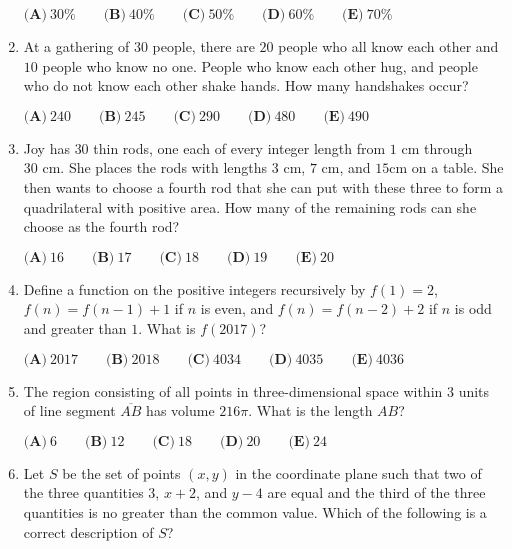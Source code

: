 \documentclass{article}
\begin{document}
\begin{enumerate}[label=\arabic*., itemsep=0.5em]
$\textbf{(A)}\ 30\%\qquad\textbf{(B)}\ 40\%\qquad\textbf{(C)}\ 50\%\qquad\textbf{(D)}\ 60\%\qquad\textbf{(E)}\ 70\%$\par \vspace{0.5em}\item At a gathering of $30$ people, there are $20$ people who all know each other and $10$ people who know no one. People who know each other hug, and people who do not know each other shake hands. How many handshakes occur?

$\textbf{(A)}\ 240\qquad\textbf{(B)}\ 245\qquad\textbf{(C)}\ 290\qquad\textbf{(D)}\ 480\qquad\textbf{(E)}\ 490$\par \vspace{0.5em}\item Joy has $30$ thin rods, one each of every integer length from $1 \text{ cm}$ through $30 \text{ cm}$. She places the rods with lengths $3 \text{ cm}$, $7 \text{ cm}$, and $15 \text{cm}$ on a table. She then wants to choose a fourth rod that she can put with these three to form a quadrilateral with positive area. How many of the remaining rods can she choose as the fourth rod?

$\textbf{(A)}\ 16 \qquad\textbf{(B)}\ 17 \qquad\textbf{(C)}\ 18 \qquad\textbf{(D)}\ 19  \qquad\textbf{(E)}\ 20$\par \vspace{0.5em}\item Define a function on the positive integers recursively by $f(1) = 2$, $f(n) = f(n-1) + 1$ if $n$ is even, and $f(n) = f(n-2) + 2$ if $n$ is odd and greater than $1$. What is $f(2017)$?

$ \textbf{(A)}\ 2017 \qquad\textbf{(B)}\ 2018 \qquad\textbf{(C)}\ 4034 \qquad\textbf{(D)}\ 4035 \qquad\textbf{(E)}\ 4036$\par \vspace{0.5em}\item The region consisting of all points in three-dimensional space within $3$ units of line segment $\overline{AB}$ has volume $216 \pi$. What is the length $AB$?

$ \textbf{(A)}\ 6 \qquad\textbf{(B)}\ 12 \qquad\textbf{(C)}\ 18 \qquad\textbf{(D)}\ 20 \qquad\textbf{(E)}\ 24$\par \vspace{0.5em}\item Let $S$ be the set of points $(x,y)$ in the coordinate plane such that two of the three quantities $3$, $x+2$, and $y-4$ are equal and the third of the three quantities is no greater than the common value. Which of the following is a correct description of $S$?


\end{enumerate}
\end{document}
